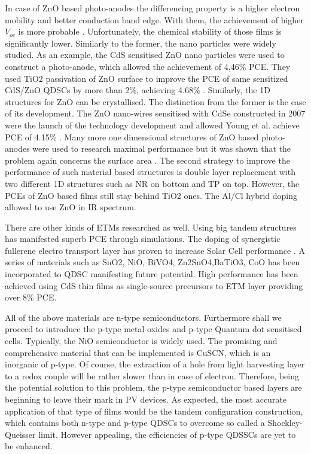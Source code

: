 \begin{enumerate}
In case of ZnO based photo-anodes the differencing property is a higher electron mobility and better conduction band edge. With them, the achievement of higher $V_{oc}$  is more probable \cite{X.Gao2017} . Unfortunately, the chemical stability of those films is significantly lower. Similarly to the former, the nano particles were widely studied. \cite{L.Lv2014a} As an example, the CdS sensitised ZnO nano particles were used to construct a photo-anode, which allowed the achievement of 4,46\% PCE. They used TiO2 passivation of ZnO surface to improve the PCE of same sensitized CdS/ZnO QDSCs by more than 2\%, achieving 4.68\% . \cite{Zhang2013b} Similarly, the 1D structures for ZnO can be crystallised. The distinction from the former is the ease of its development. The ZnO nano-wires sensitised with CdSe constructed in 2007 were the launch of the technology development and allowed Young et al. achieve PCE of 4.15\% \cite{J.Qiu2013} . Many more one dimensional structures of ZnO based photo-anodes were used to research maximal performance but it was shown that the problem again concerns the surface area \cite{Gonzalez-Pedro2015} . The second strategy to improve the performance of such material based structures is double layer replacement with two different 1D structures such as NR on bottom and TP on top.  However, the PCEs of ZnO based films still stay behind TiO2 ones.\cite{Zhang2013b}  The Al/Cl hybrid doping allowed to use ZnO in IR spectrum.

There are other kinds of ETMs researched as well.  Using big tandem structures has manifested superb PCE through simulations. \cite{GregoryF.Pach2017} The doping of synergistic fullerene electro transport layer has proven to increase Solar Cell performance \cite{OleksandrVoznyy2014} . A series of materials such as SnO2, NiO, BiVO4, Zn2SnO4,BaTiO3, CoO has been incorporated to QDSC manifesting future potential. High performance has been achieved using CdS thin films as single-source precursors to ETM layer providing over 8\% PCE. \cite{RobertJ.Patterson2017}

All of the above materials are n-type semiconductors. Furthermore shall we proceed to introduce the p-type metal oxides and p-type Quantum dot sensitised cells. Typically, the NiO semiconductor is widely used. The promising and comprehensive material that can be implemented is CuSCN, which is an inorganic of p-type. Of course, the extraction of a hole from light harvesting layer to a redox couple will be rather slower than in case of electron. Therefore, being the potential solution to this problem, the p-type semiconductor based layers are beginning to leave their mark in PV devices. As expected, the most accurate application of that type of films would be the tandem configuration construction, which contains both n-type and p-type QDSCs to overcome so called  a Shockley-Queisser limit. However appealing, the efficiencies of p-type QDSSCs are yet to be enhanced.



\end{enumerate}
